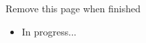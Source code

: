 \listoftodos
 Remove this page when finished
\begin{itemize}
    \item In progress...
\end{itemize}

\newpage
